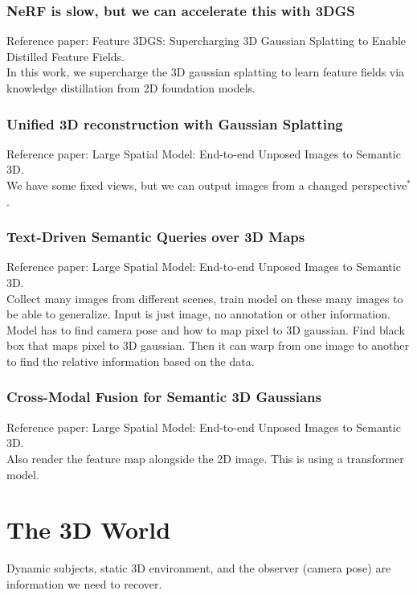 \documentclass[11pt, oneside]{book}
\begin{document}
\subsection{NeRF is slow, but we can accelerate this with 3DGS}
Reference paper: Feature 3DGS: Supercharging 3D Gaussian Splatting to Enable Distilled Feature Fields. \\ 

\noindent In this work, we supercharge the 3D gaussian splatting to learn feature fields via knowledge distillation from 2D foundation models.

\subsection{Unified 3D reconstruction with Gaussian Splatting}
Reference paper: Large Spatial Model: End-to-end Unposed Images to Semantic 3D. \\ 

\noindent We have some fixed views, but we can output images from a changed perspective$^*$. 

\subsection{Text-Driven Semantic Queries over 3D Maps}
Reference paper: Large Spatial Model: End-to-end Unposed Images to Semantic 3D. \\ 

\noindent Collect many images from different scenes, train model on these many images to be able to generalize. Input is just image, no 
annotation or other information. Model has to find camera pose and how to map pixel to 3D gaussian. Find black box that maps pixel to 3D gaussian.
Then it can warp from one image to another to find the relative information based on the data.

\subsection{Cross-Modal Fusion for Semantic 3D Gaussians}
Reference paper: Large Spatial Model: End-to-end Unposed Images to Semantic 3D. \\ 

\noindent Also render the feature map alongside the 2D image. This is using a transformer model. 

\chapter{The 3D World}
Dynamic subjects, static 3D environment, and the observer (camera pose) are information we need to recover.
\end{document}
